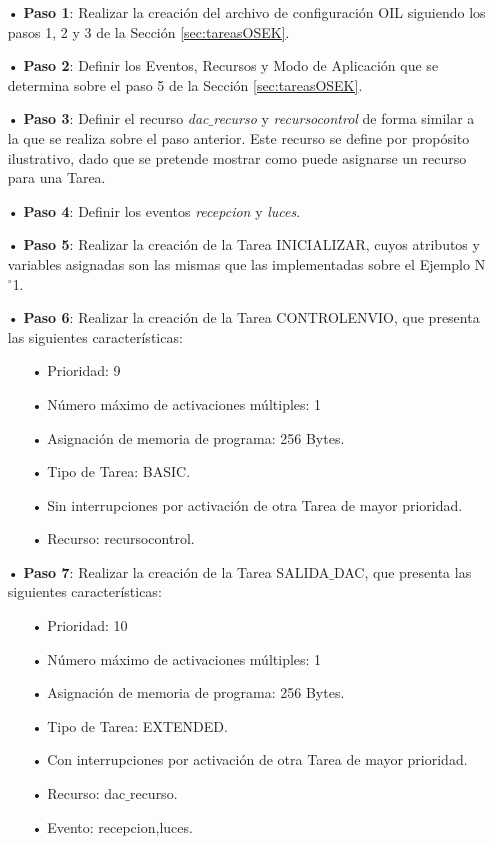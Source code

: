\documentclass[12pt,letterpaper]{article}
\begin{document}
\begin{enumerate}

\item[•]\textbf{Paso 1}: Realizar la creación del archivo de configuración OIL siguiendo los pasos 1, 2 y 3 de la Sección \ref{sec:tareasOSEK}.
\item[•]\textbf{Paso 2}: Definir los Eventos, Recursos y Modo de Aplicación que se determina sobre el paso 5 de la Sección \ref{sec:tareasOSEK}.
\item[•]\textbf{Paso 3}: Definir el recurso \textit{dac$\_$recurso} y \textit{recursocontrol} de forma similar a la que se realiza sobre el paso anterior. Este recurso se define por propósito ilustrativo, dado que se pretende mostrar como puede asignarse un recurso para una Tarea.
\item[•]\textbf{Paso 4}: Definir los eventos \textit{recepcion} y \textit{luces}. 
\item[•]\textbf{Paso 5}: Realizar la creación de la Tarea INICIALIZAR, cuyos atributos y variables asignadas son las mismas que las implementadas sobre el Ejemplo N$^{\circ}$1.

\item[•]\textbf{Paso 6}: Realizar la creación de la Tarea CONTROLENVIO, que presenta las siguientes características:
\begin{enumerate}
\item[•]Prioridad: 9
\item[•]Número máximo de activaciones múltiples: 1
\item[•]Asignación de memoria de programa: 256 Bytes.
\item[•]Tipo de Tarea: BASIC.
\item[•]Sin interrupciones por activación de otra Tarea de mayor prioridad.
\item[•]Recurso: recursocontrol.

\end{enumerate}

\item[•]\textbf{Paso 7}: Realizar la creación de la Tarea SALIDA$\_$DAC, que presenta las siguientes características:
\begin{enumerate}
\item[•]Prioridad: 10
\item[•]Número máximo de activaciones múltiples: 1
\item[•]Asignación de memoria de programa: 256 Bytes.
\item[•]Tipo de Tarea: EXTENDED.
\item[•]Con interrupciones por activación de otra Tarea de mayor prioridad.
\item[•]Recurso: dac$\_$recurso.
\item[•]Evento: recepcion,luces.
\end{enumerate}


\end{enumerate}
\end{document}
